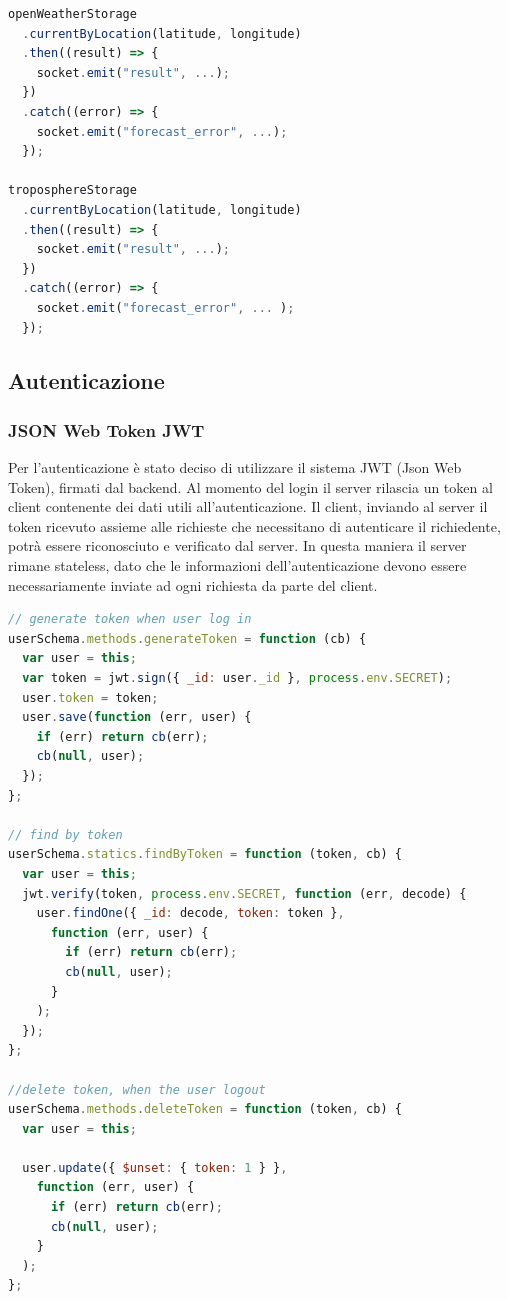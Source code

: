 \begin{lstlisting}[language=Javascript]
openWeatherStorage
  .currentByLocation(latitude, longitude)
  .then((result) => {
    socket.emit("result", ...);
  })
  .catch((error) => {
    socket.emit("forecast_error", ...);
  });
  
troposphereStorage
  .currentByLocation(latitude, longitude)
  .then((result) => {
    socket.emit("result", ...);
  })
  .catch((error) => {
    socket.emit("forecast_error", ... );
  });
\end{lstlisting}

\subsection{Autenticazione}

\subsubsection{JSON Web Token JWT}
Per l'autenticazione è stato deciso di utilizzare il sistema JWT (Json Web Token), firmati dal backend. Al momento del login il server rilascia un token al client contenente dei dati utili all’autenticazione. Il client, inviando al server il token ricevuto assieme alle richieste che necessitano di autenticare il richiedente, potrà essere riconosciuto e verificato dal server. In questa maniera il server rimane stateless, dato che le informazioni dell'autenticazione devono essere necessariamente inviate ad ogni richiesta da parte del client.

\begin{lstlisting}[language=Javascript]
// generate token when user log in
userSchema.methods.generateToken = function (cb) {
  var user = this;
  var token = jwt.sign({ _id: user._id }, process.env.SECRET);
  user.token = token;
  user.save(function (err, user) {
    if (err) return cb(err);
    cb(null, user);
  });
};

// find by token
userSchema.statics.findByToken = function (token, cb) {
  var user = this;
  jwt.verify(token, process.env.SECRET, function (err, decode) {
    user.findOne({ _id: decode, token: token },
      function (err, user) {
        if (err) return cb(err);
        cb(null, user);
      }
    );
  });
};

//delete token, when the user logout
userSchema.methods.deleteToken = function (token, cb) {
  var user = this;

  user.update({ $unset: { token: 1 } },
    function (err, user) {
      if (err) return cb(err);
      cb(null, user);
    }
  );
};

\end{lstlisting}

